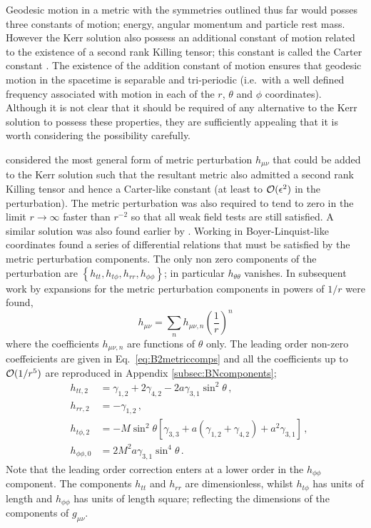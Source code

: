 Geodesic motion in a metric with the symmetries outlined thus far would posses three constants of motion; energy, angular momentum and particle rest mass. However the Kerr solution also possess an additional constant of motion related to the existence of a second rank Killing tensor; this constant is called the Carter constant \citep{PhysRev.174.1559}. The existence of the addition constant of motion ensures that geodesic motion in the spacetime is separable and tri-periodic (i.e.\ with a well defined frequency associated with motion in each of the $r$, $\theta$ and $\phi$ coordinates). Although it is not clear that it should be required of any alternative to the Kerr solution to possess these properties, they are sufficiently appealing that it is worth considering the possibility carefully.

\cite{2011PhRvD..83j4027V} considered the most general form of metric perturbation $h_{\mu\nu}$ that could be added to the Kerr solution such that the resultant metric also admitted a second rank Killing tensor and hence a Carter-like constant (at least to ${\cal{O}} (\epsilon ^{2})$ in the perturbation). The metric perturbation was also required to tend to zero in the limit $r\rightarrow\infty$ faster than $r^{-2}$ so that all weak field tests are still satisfied. A similar solution was also found earlier by \cite{1979GReGr..10...79B}. Working in Boyer-Linquist-like coordinates \cite{2011PhRvD..83j4027V} found a series of differential relations that must be satisfied by the metric perturbation components. The only non zero components of the perturbation are $\left\{ h_{tt}, h_{t \phi }, h_{rr}, h_{ \phi \phi } \right\}$; in particular $h_{\theta\theta}$ vanishes. In subsequent work by \cite{2011PhRvD..84f4016G} expansions for the metric perturbation components in powers of $1/r$ were found,
\begin{equation} h_{\mu \nu}=\sum_{n}h_{\mu \nu, n}\left( \frac{1}{r} \right)^{n} \end{equation}
where the coefficients $h_{\mu \nu , n}$ are functions of $\theta$ only. The leading order non-zero coeffeicients are given in Eq.\ \ref{eq:B2metriccomps} and all the coefficients up to ${\cal{O}}(1/r^{5})$ are reproduced in Appendix \ref{subsec:BNcomponents};
\begin{eqnarray}\label{eq:B2metriccomps}
&h_{tt,2}&=\gamma_{1,2}+2\gamma_{4,2}-2a\gamma_{3,1}\sin^{2}\theta \, , \nonumber \\
&h_{rr,2}&=-\gamma_{1,2}\, ,\nonumber\\
&h_{t\phi,2}&=-M\sin^{2}\theta\left[ \gamma_{3,3}+a\left(\gamma_{1,2}+\gamma_{4,2} \right) +a^{2}\gamma_{3,1} \right] \, , \nonumber \\
&h_{\phi\phi,0}&=2M^{2}a\gamma_{3,1}\sin^{4}\theta\, .
\end{eqnarray}
Note that the leading order correction enters at a lower order in the $h_{\phi\phi}$ component. The components $h_{tt}$ and $h_{rr}$ are dimensionless, whilst $h_{t\phi}$ has units of length and $h_{\phi\phi}$ has units of length square; reflecting the dimensions of the components of $g_{\mu\nu}$.

